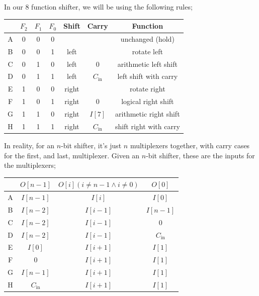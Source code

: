 \documentclass[a4paper, 12pt]{article}
\begin{document}
            In our 8 function shifter, we will be using the following rules;
            \begin{center}
                \begin{tabular}{c||c|c|c||c|c||c}
                    & $F_2$ & $F_1$ & $F_0$ & Shift & Carry & Function \\
                    \hline
                    A & 0 & 0 & 0 & & & unchanged (hold) \\
                    B & 0 & 0 & 1 & left & & rotate left \\
                    C & 0 & 1 & 0 & left & 0 & arithmetic left shift \\
                    D & 0 & 1 & 1 & left & $C_\text{in}$ & left shift with carry \\
                    E & 1 & 0 & 0 & right & & rotate right \\
                    F & 1 & 0 & 1 & right & 0 & logical right shift \\
                    G & 1 & 1 & 0 & right & $I[7]$ & arithmetic right shift \\
                    H & 1 & 1 & 1 & right & $C_\text{in}$ & shift right with carry
                \end{tabular}
            \end{center}
            In reality, for an $n$-bit shifter, it's just $n$ multiplexers together, with carry cases for the first, and last, multiplexer. Given an $n$-bit shifter, these are the inputs for the multiplexers;
            \begin{center}
                \begin{tabular}{c||c|c|c}
                    & $O[n-1]$ & $O[i] (i \neq n-1 \land i \neq 0)$ & $O[0]$ \\
                    \hline
                    A & $I[n-1]$ & $I[i]$ & $I[0]$ \\
                    B & $I[n-2]$ & $I[i-1]$ & $I[n-1]$ \\
                    C & $I[n-2]$ & $I[i-1]$ & $0$ \\
                    D & $I[n-2]$ & $I[i-1]$ & $C_\text{in}$ \\
                    E & $I[0]$ & $I[i+1]$ & $I[1]$ \\
                    F & 0 & $I[i+1]$ & $I[1]$ \\
                    G & $I[n-1]$ & $I[i+1]$ & $I[1]$ \\
                    H & $C_\text{in}$ & $I[i+1]$ & $I[1]$
                \end{tabular}
            \end{center}
\end{document}

